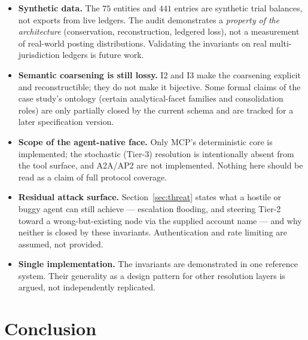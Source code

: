 \documentclass[11pt]{clapps}  %
\begin{document}
\begin{itemize}
  \item \textbf{Synthetic data.} The $75$ entities and $441$ entries are
  synthetic trial balances, not exports from live ledgers. The audit
  demonstrates a \emph{property of the architecture} (conservation,
  reconstruction, ledgered loss), not a measurement of real-world posting
  distributions. Validating the invariants on real multi-jurisdiction ledgers
  is future work.
  \item \textbf{Semantic coarsening is still lossy.} I2 and I3 make the
  coarsening explicit and reconstructible; they do not make it bijective. Some
  formal claims of the case study's ontology (certain analytical-facet families
  and consolidation roles) are only partially closed by the current schema and
  are tracked for a later specification version.
  \item \textbf{Scope of the agent-native face.} Only MCP's deterministic core
  is implemented; the stochastic (Tier-3) resolution is intentionally absent
  from the tool surface, and A2A/AP2 are not implemented. Nothing here should be
  read as a claim of full protocol coverage.
  \item \textbf{Residual attack surface.} Section~\ref{sec:threat} states what a
  hostile or buggy agent can still achieve --- escalation flooding, and steering
  Tier-2 toward a wrong-but-existing node via the supplied account name --- and
  why neither is closed by these invariants. Authentication and rate limiting
  are assumed, not provided.
  \item \textbf{Single implementation.} The invariants are demonstrated in one
  reference system. Their generality as a design pattern for other
  resolution layers is argued, not independently replicated.
\end{itemize}

\section{Conclusion}
\end{document}
